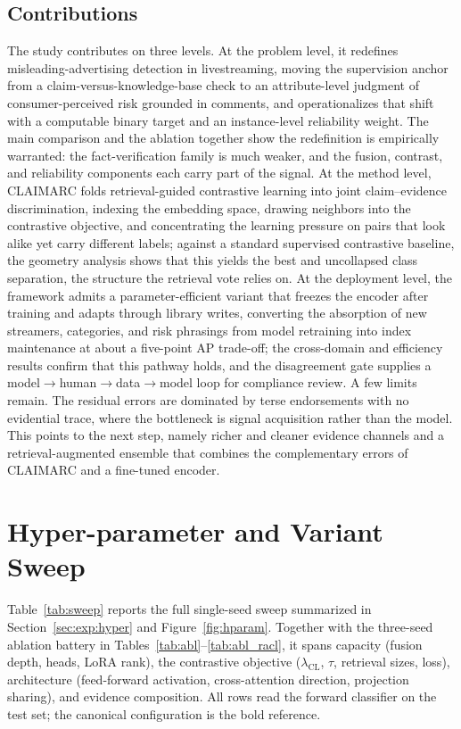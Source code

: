 \documentclass[11pt]{article}
\begin{document}
\subsection{Contributions}
\label{sec:concl:contrib}

The study contributes on three levels. At the problem level, it redefines
misleading-advertising detection in livestreaming, moving the supervision
anchor from a claim-versus-knowledge-base check to an attribute-level judgment
of consumer-perceived risk grounded in comments, and operationalizes that shift
with a computable binary target and an instance-level reliability weight. The
main comparison and the ablation together show the redefinition is empirically
warranted: the fact-verification family is much weaker, and the fusion,
contrast, and reliability components each carry part of the signal. At the method level, CLAIMARC
folds retrieval-guided contrastive learning into joint claim--evidence
discrimination, indexing the embedding space, drawing neighbors into the
contrastive objective, and concentrating the learning pressure on pairs that
look alike yet carry different labels; against a standard supervised contrastive
baseline, the geometry analysis shows that this yields the best and uncollapsed
class separation, the structure the retrieval vote relies on. At the
deployment level, the framework admits a parameter-efficient variant that freezes
the encoder after training and adapts through library writes, converting the
absorption of new streamers, categories, and risk phrasings from model retraining
into index maintenance at about a five-point AP trade-off; the cross-domain and
efficiency results confirm that this pathway holds, and the disagreement gate
supplies a model$\to$human$\to$data$\to$model loop for compliance review. A few
limits remain. The residual errors are dominated by terse endorsements with no
evidential trace, where the bottleneck is signal acquisition rather than the
model. This points to the next step, namely richer and cleaner evidence channels and
a retrieval-augmented ensemble that combines the complementary errors of CLAIMARC
and a fine-tuned encoder.

\appendix
\section{Hyper-parameter and Variant Sweep}
\label{app:sweep}

Table~\ref{tab:sweep} reports the full single-seed sweep summarized in
Section~\ref{sec:exp:hyper} and Figure~\ref{fig:hparam}. Together with the
three-seed ablation battery in Tables~\ref{tab:abl}--\ref{tab:abl_racl}, it spans capacity (fusion depth, heads, LoRA rank), the
contrastive objective ($\lambda_{\mathrm{CL}}$, $\tau$, retrieval sizes, loss),
architecture (feed-forward activation, cross-attention direction, projection
sharing), and evidence composition. All rows read the forward classifier on the
test set; the canonical configuration is the bold reference.
\end{document}
